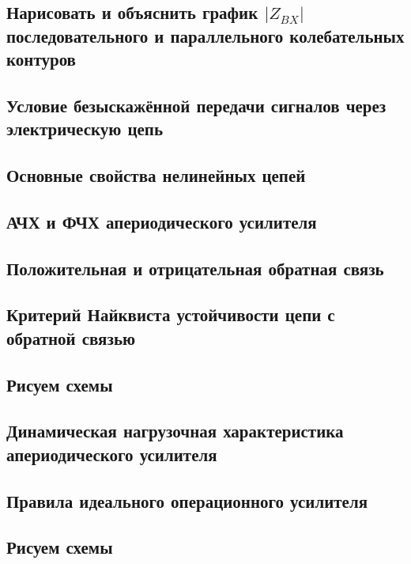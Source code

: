 \documentclass[a4paper,14pt]{extarticle}
\theoremstyle{definition}
\begin{document}
\subsection{Нарисовать и объяснить график $|Z_{BX}|$ последовательного и параллельного колебательных
контуров}

\subsection{Условие безыскажённой передачи сигналов через электрическую цепь}

\subsection{Основные свойства нелинейных цепей}

\subsection{АЧХ и ФЧХ апериодического усилителя}

\subsection{Положительная и отрицательная обратная связь}

\subsection{Критерий Найквиста устойчивости цепи с обратной связью}

\subsection{Рисуем схемы}

\subsection{Динамическая нагрузочная характеристика апериодического усилителя}

\subsection{Правила идеального операционного усилителя}

\subsection{Рисуем схемы}
\end{document}
